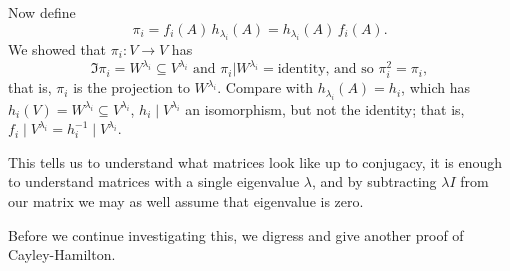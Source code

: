 Now define
\begin{equation*}
	\pi_i = f_i(A)\,h_{\lambda_i}(A) = h_{\lambda_i}(A)\,f_i(A).
\end{equation*}
We showed that $\pi_i:V\to V$ has
\begin{equation*}
	\Im \pi_i = W^{\lambda_i} \subseteq V^{\lambda_i}
	\text{ and }
	\pi_i \vert W^{\lambda_i} = \text{identity, and so } \pi_i^2 = \pi_i,
\end{equation*}
that is, $\pi_i$ is the projection to $W^{\lambda_i}$. Compare with $h_{\lambda_i}(A)=h_i$, which has $h_i(V)=W^{\lambda_i}\subseteq V^{\lambda_i}$, $h_i \mid V^{\lambda_i}$ an isomorphism, but not the identity; that is, $f_i \mid V^{\lambda_i} = h_i^{-1} \mid V^{\lambda_i}$.

This tells us to understand what matrices look like up to conjugacy, it is enough to understand matrices with a single eigenvalue $\lambda$, and by subtracting $\lambda I$ from our matrix we may as well assume that eigenvalue is zero.

Before we continue investigating this, we digress and give another proof of Cayley-Hamilton.

